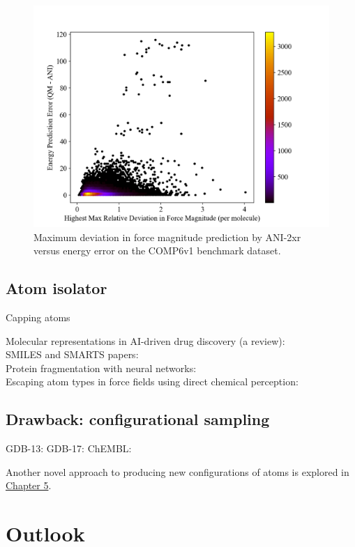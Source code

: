 \begin{figure}[!hp]
    \centering
    \includegraphics[width=1\linewidth]{Images/2xr_forces/2xr_comp6v1_force-highest-force_deviation-vs-energy.png}
    \caption[Maximum deviation in force magnitude prediction versus energy error (COMP6v1)]{Maximum deviation in force magnitude prediction by ANI-2xr versus energy error on the COMP6v1 benchmark dataset.}
    \label{fig:2xr_comp6v1-forces-highest_deviation}
\end{figure}


\subsection{Atom isolator}
\label{subsec:atom_isolator}
Capping atoms

Molecular representations in AI-driven drug discovery (a review): \cite{mol_reps_in_AI_drug_discovery_david}\\
SMILES and SMARTS papers: \cite{SMILES_pair_encoding_li, mol_patterns_SMARTS_schmidt, automated_fragment_gen_smiles_bilsland}\\
Protein fragmentation with neural networks: \cite{protein_ff_fragmentation_nn_wang}\\
Escaping atom types in force fields using direct chemical perception: \cite{direct_chem_perception_mobley} \\

\subsection{Drawback: configurational sampling}
\label{subsec:drawback_config_sampling}

GDB-13: \cite{gdb-13}
GDB-17: \cite{gdb-17}
ChEMBL: \cite{ChEMBL_gaulton}

Another novel approach to producing new configurations of atoms is explored in \hyperlink{configurational_sampling}{Chapter 5}.

\section{Outlook}